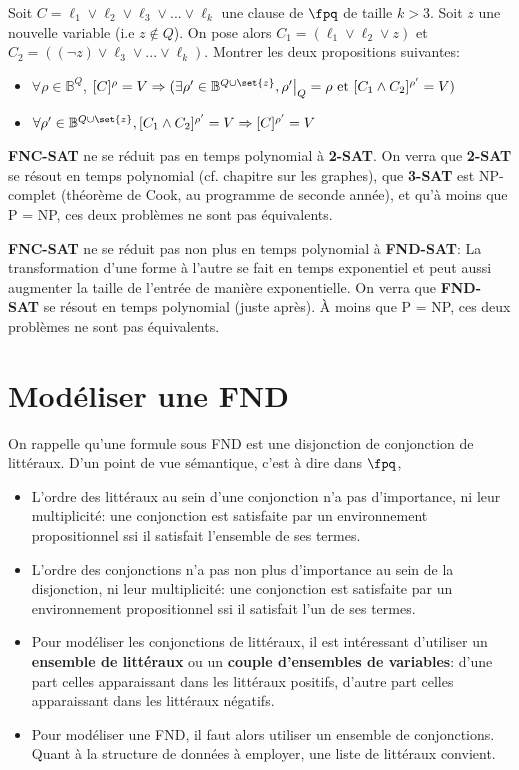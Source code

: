 \documentclass{scrartcl}
\begin{document}
		\exo Soit $C = \ell_1 \vee \ell_2 \vee \ell_3 \vee ... \vee \ell_k$ une clause de $\fpq$ de taille $k > 3$.
		Soit $z$ une nouvelle variable (i.e $z \not\in Q$). 
		On pose alors $C_1 = (\ell_1 \vee \ell_2 \vee z)$ et $C_2 = ((\neg z) \vee \ell_3 \vee ... \vee \ell_k)$.
		Montrer les deux propositions suivantes:
		\begin{itemize}
			\item $\forall \rho \in \mathbb{B}^Q$, $[C]^\rho = V \Rightarrow 
				(\exists \rho' \in \mathbb{B}^{Q\cup\set{z}}, \rho'\big|_Q = \rho \text{ et } [C_1\wedge C_2]^{\rho'} = V)$
			\item $\forall \rho' \in \mathbb{B}^{Q\cup\set{z}}, [C_1\wedge C_2]^{\rho'} = V \Rightarrow [C]^{\rho'} = V$
		\end{itemize}

		\rem \textbf{FNC-SAT} ne se réduit pas en temps polynomial à \textbf{2-SAT}. 
		On verra que \textbf{2-SAT} se résout en temps polynomial (cf. chapitre sur les graphes), 
		que \textbf{3-SAT} est NP-complet (théorème de Cook, au programme de seconde année),
		et qu'à moins que P = NP, ces deux problèmes ne sont pas équivalents.

		\rem \textbf{FNC-SAT} ne se réduit pas non plus en temps polynomial à \textbf{FND-SAT}:
		La transformation d'une forme à l'autre se fait en temps exponentiel et peut aussi augmenter la taille de l'entrée de manière exponentielle.
		On verra que \textbf{FND-SAT} se résout en temps polynomial (juste après).
		À moins que P = NP, ces deux problèmes ne sont pas équivalents.

	\section{Modéliser une FND}
		On rappelle qu'une formule sous FND est une disjonction de conjonction de littéraux. D'un point de vue sémantique, c'est à dire dans $\fpq$,
		\begin{itemize}
			\item L'ordre des littéraux au sein d'une conjonction n'a pas d'importance, ni leur multiplicité:
				une conjonction est satisfaite par un environnement propositionnel ssi il satisfait l’ensemble de ses termes.
			\item L'ordre des conjonctions n'a pas non plus d'importance au sein de la disjonction, ni leur multiplicité:
				une conjonction est satisfaite par un environnement propositionnel ssi il satisfait l'un de ses termes.
			\item Pour modéliser les conjonctions de littéraux, il est intéressant d'utiliser un \textbf{ensemble de littéraux} ou un \textbf{couple d'ensembles de variables}:
				d'une part celles apparaissant dans les littéraux positifs, d'autre part celles apparaissant dans les littéraux négatifs.
			\item Pour modéliser une FND, il faut alors utiliser un ensemble de conjonctions. 
				Quant à la structure de données à employer, une liste de littéraux convient.
		\end{itemize}
	
\end{document}
